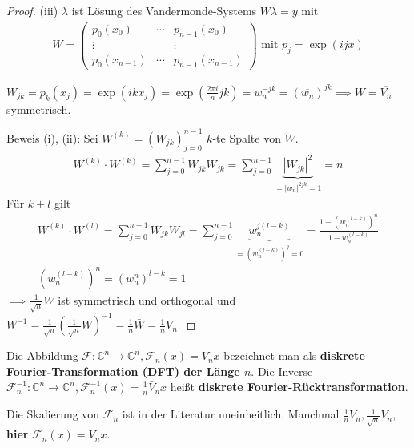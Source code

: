 \begin{proof}
	(iii) $\lambda$ ist Lösung des Vandermonde-Systems $W\lambda = y$ mit
	\begin{align*}
		W = \left(\begin{matrix}
			p_0(x_0) & \cdots & p_{n-1}(x_0)\\
			\vdots & & \vdots\\
			p_0(x_{n-1}) & \cdots & p_{n-1}(x_{n-1})
		\end{matrix}\right) \text{ mit } p_j = \exp(ijx)
	\end{align*}
	
	$W_{jk} = p_k(x_j) = \exp(ikx_j) = \exp\left(\frac{2\pi i}{n} jk\right) = w_n^{-jk} = (\overline{w_n})^{jk} \implies W = \overline{V_n}$ symmetrisch.
	
	Beweis (i), (ii): Sei $W^{(k)} = (W_{jk})_{j=0}^{n-1}$ $k$-te Spalte von $W$.
	\begin{align*}
		W^{(k)} \cdot W^{(k)} = \sum_{j=0}^{n-1} W_{jk} \overline{W}_{jk} = \sum_{j=0}^{n-1} \underbrace{|W_{jk}|^2}_{=|w_n|^{2jk}=1} = n
	\end{align*}
	Für $k+l$ gilt
	\begin{align*}
		W^{(k)} \cdot W^{(l)} = \sum_{j=0}^{n-1} W_{jk} \overline{W_{jl}} = \sum_{j=0}^{n-1} \underbrace{w_n^{j(l-k)}}_{=(w_n^{(l-k)})^j=0} = \frac{1-(w_n^{(l-k)})^n}{1-w_n^{(l-k)}}\\
		(w_n^{(l-k)})^n = (w_n^n)^{l-k} = 1
	\end{align*}
	$\implies \frac{1}{\sqrt{n}}W$ ist symmetrisch und orthogonal und $W^{-1} = \frac{1}{\sqrt{n}} \left(\frac{1}{\sqrt{n}}W\right)^{-1} = \frac{1}{n} \bar{W} = \frac{1}{n} V_n$.
\end{proof}

\begin{definition}
	Die Abbildung $\mathcal{F}:\mathbb{C}^n \rightarrow \mathbb{C}^n, \mathcal{F}_n(x) = V_n x$ bezeichnet man als \textbf{diskrete Fourier-Transformation (DFT) der Länge $n$}. Die Inverse $\mathcal{F}_n^{-1}: \mathbb{C}^n \rightarrow \mathbb{C}^n, \mathcal{F}_n^{-1}(x) = \frac{1}{n}\bar{V}_nx$ heißt \textbf{diskrete Fourier-Rücktransformation}.
\end{definition}

\begin{remark}
	Die Skalierung von $\mathcal{F}_n$ ist in der Literatur uneinheitlich. Manchmal $\frac{1}{n}V_n, \frac{1}{\sqrt{n}}V_n$, \textbf{hier} $\mathcal{F}_n(x) = V_n x$.
\end{remark}

